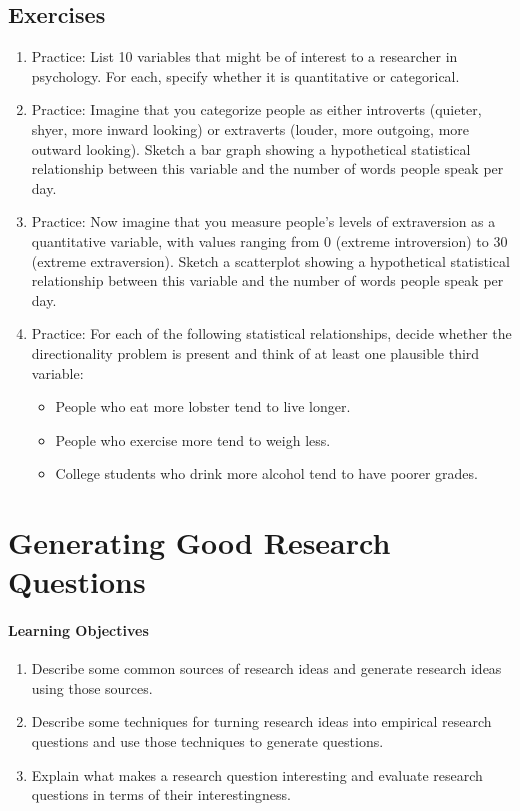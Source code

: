 \subsection{Exercises}
\begin{fullwidth}
\begin{enumerate}
\item Practice: List 10 variables that might be of interest to a researcher in psychology. For each, specify whether it is quantitative or categorical.
\item Practice: Imagine that you categorize people as either introverts (quieter, shyer, more inward looking) or extraverts (louder, more outgoing, more outward looking). Sketch a bar graph showing a hypothetical statistical relationship between this variable and the number of words people speak per day.
\item Practice: Now imagine that you measure people's levels of extraversion as a quantitative variable, with values ranging from 0 (extreme introversion) to 30 (extreme extraversion). Sketch a scatterplot showing a hypothetical statistical relationship between this variable and the number of words people speak per day.
\item Practice: For each of the following statistical relationships, decide whether the directionality problem is present and think of at least one plausible third variable:
\begin{itemize}
\item People who eat more lobster tend to live longer.
\item People who exercise more tend to weigh less.
\item College students who drink more alcohol tend to have poorer grades.
\end{itemize}
\end{enumerate}
\end{fullwidth}

\newpage
\section{Generating Good Research Questions}

\paragraph{Learning Objectives}
\begin{enumerate}
\item Describe some common sources of research ideas and generate research ideas using those sources.
\item Describe some techniques for turning research ideas into empirical research questions and use those techniques to generate questions.
\item Explain what makes a research question interesting and evaluate research questions in terms of their interestingness.
\end{enumerate}


